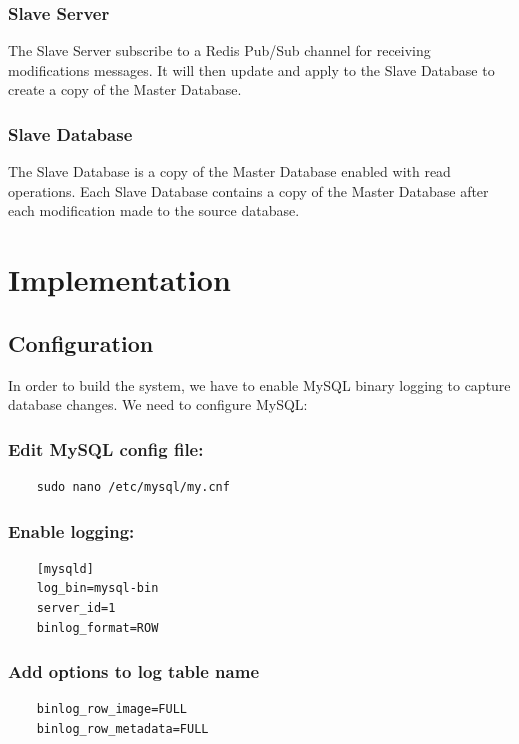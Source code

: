 \documentclass[a4paper,12pt]{report}
\begin{document}
\subsubsection{Slave Server}
The Slave Server subscribe to a Redis Pub/Sub channel for receiving modifications messages. It will then update and apply to the Slave Database to create a copy of the Master Database.

\subsubsection{Slave Database}
The Slave Database is a copy of the Master Database enabled with read operations. Each Slave Database contains a copy of the Master Database after each modification made to the source database.

\newpage
\section{\bfseries Implementation}
\fontsize{13}{16}\selectfont
\subsection{Configuration}
In order to build the system, we have to enable MySQL binary logging to capture database changes. We need to configure MySQL:

\subsubsection{Edit MySQL config file:}
\begin{verbatim}
    sudo nano /etc/mysql/my.cnf
\end{verbatim}

\subsubsection{Enable logging:}
\begin{verbatim}
    [mysqld]
    log_bin=mysql-bin
    server_id=1
    binlog_format=ROW
\end{verbatim}

\subsubsection{Add options to log table name}
\begin{verbatim}
    binlog_row_image=FULL
    binlog_row_metadata=FULL
\end{verbatim}
\end{document}
